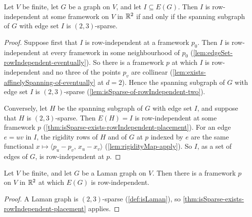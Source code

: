 \begin{theorem}
  \label{thm:edgeSet-rowIndependent-iff-isSparse}
  \leanok
  Let $V$ be finite, let $G$ be a graph on $V$, and let
  $I \subseteq E(G)$. Then $I$ is row-independent at some framework on
  $V$ in ${\mathbb{R}}^{2}$ if and only if the spanning subgraph of $G$ with edge
  set $I$ is $(2, 3)$-sparse.
\end{theorem}
\begin{proof}
  \leanok
  Suppose first that $I$ is row-independent at a framework $p_0$. Then
  $I$ is row-independent at every framework in some neighbourhood of
  $p_0$ (\cref{lem:edgeSet-rowIndependent-eventually}). So there is a
  framework $p$ at which $I$ is row-independent and no three of the
  points $p_v$ are collinear
  (\cref{lem:exists-affinelySpanning-of-eventually} at $d = 2$). Hence
  the spanning subgraph of $G$ with edge set $I$ is $(2, 3)$-sparse
  (\cref{lem:isSparse-of-rowIndependent-two}).

  Conversely, let $H$ be the spanning subgraph of $G$ with edge set
  $I$, and suppose that $H$ is $(2, 3)$-sparse. Then $E(H) = I$ is
  row-independent at some framework $p$
  (\cref{thm:isSparse-exists-rowIndependent-placement}). For an edge
  $e = uv$ in $I$, the rigidity rows of $H$ and of $G$ at $p$ indexed
  by $e$ are the same functional
  $x \mapsto \langle p_u - p_v,\, x_u - x_v \rangle$
  (\cref{lem:rigidityMap-apply}). So $I$, as a set of edges of $G$, is
  row-independent at $p$.
\end{proof}

\begin{corollary}
  \label{cor:isLaman-exists-rowIndependent}
  \leanok
  Let $V$ be finite, and let $G$ be a Laman graph on $V$. Then there is
  a framework $p$ on $V$ in ${\mathbb{R}}^{2}$ at which $E(G)$ is
  row-independent.
\end{corollary}
\begin{proof}
  \leanok
  A Laman graph is $(2, 3)$-sparse (\cref{def:isLaman}), so
  \cref{thm:isSparse-exists-rowIndependent-placement} applies.
\end{proof}

